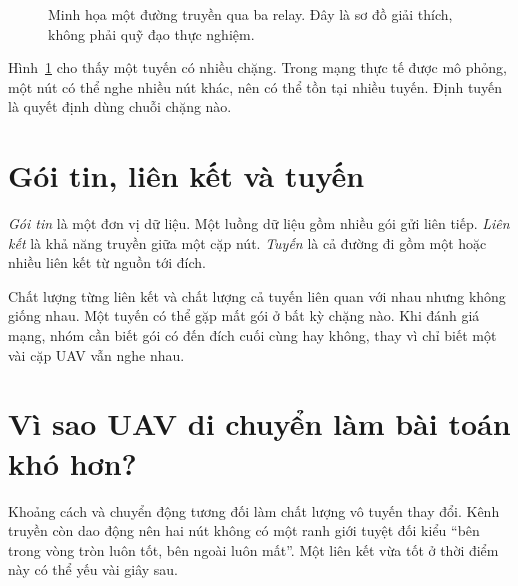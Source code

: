 \begin{figure}[htbp]
\centering
{}
\caption{Minh họa một đường truyền qua ba relay. Đây là sơ đồ giải thích, không phải quỹ đạo thực nghiệm.}\label{fig:relay}
\end{figure}

Hình~\ref{fig:relay} cho thấy một tuyến có nhiều chặng. Trong mạng thực tế được mô phỏng, một nút có thể nghe nhiều nút khác, nên có thể tồn tại nhiều tuyến. Định tuyến là quyết định dùng chuỗi chặng nào.

\section{Gói tin, liên kết và tuyến}
\emph{Gói tin} là một đơn vị dữ liệu. Một luồng dữ liệu gồm nhiều gói gửi liên tiếp. \emph{Liên kết} là khả năng truyền giữa một cặp nút. \emph{Tuyến} là cả đường đi gồm một hoặc nhiều liên kết từ nguồn tới đích.

Chất lượng từng liên kết và chất lượng cả tuyến liên quan với nhau nhưng không giống nhau. Một tuyến có thể gặp mất gói ở bất kỳ chặng nào. Khi đánh giá mạng, nhóm cần biết gói có đến đích cuối cùng hay không, thay vì chỉ biết một vài cặp UAV vẫn nghe nhau.


\section{Vì sao UAV di chuyển làm bài toán khó hơn?}
Khoảng cách và chuyển động tương đối làm chất lượng vô tuyến thay đổi. Kênh truyền còn dao động nên hai nút không có một ranh giới tuyệt đối kiểu ``bên trong vòng tròn luôn tốt, bên ngoài luôn mất''. Một liên kết vừa tốt ở thời điểm này có thể yếu vài giây sau.

